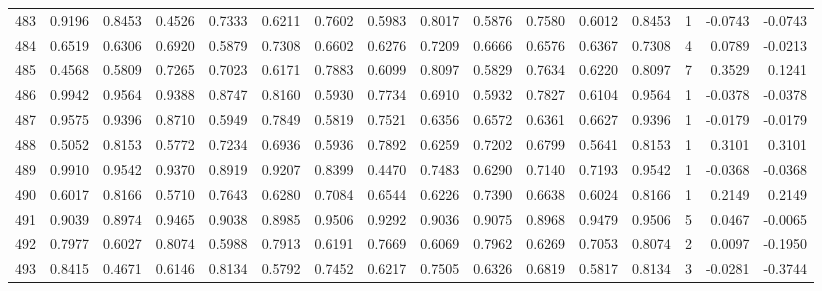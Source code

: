 \begin{tabular}{lrrrrrrrrrrrrrrr}
483 &      0.9196 &  0.8453 &  0.4526 &  0.7333 &  0.6211 &  0.7602 &  0.5983 &  0.8017 &  0.5876 &  0.7580 &   0.6012 &     0.8453 &      1 &                   -0.0743 &                    -0.0743 \\
484 &      0.6519 &  0.6306 &  0.6920 &  0.5879 &  0.7308 &  0.6602 &  0.6276 &  0.7209 &  0.6666 &  0.6576 &   0.6367 &     0.7308 &      4 &                    0.0789 &                    -0.0213 \\
485 &      0.4568 &  0.5809 &  0.7265 &  0.7023 &  0.6171 &  0.7883 &  0.6099 &  0.8097 &  0.5829 &  0.7634 &   0.6220 &     0.8097 &      7 &                    0.3529 &                     0.1241 \\
486 &      0.9942 &  0.9564 &  0.9388 &  0.8747 &  0.8160 &  0.5930 &  0.7734 &  0.6910 &  0.5932 &  0.7827 &   0.6104 &     0.9564 &      1 &                   -0.0378 &                    -0.0378 \\
487 &      0.9575 &  0.9396 &  0.8710 &  0.5949 &  0.7849 &  0.5819 &  0.7521 &  0.6356 &  0.6572 &  0.6361 &   0.6627 &     0.9396 &      1 &                   -0.0179 &                    -0.0179 \\
488 &      0.5052 &  0.8153 &  0.5772 &  0.7234 &  0.6936 &  0.5936 &  0.7892 &  0.6259 &  0.7202 &  0.6799 &   0.5641 &     0.8153 &      1 &                    0.3101 &                     0.3101 \\
489 &      0.9910 &  0.9542 &  0.9370 &  0.8919 &  0.9207 &  0.8399 &  0.4470 &  0.7483 &  0.6290 &  0.7140 &   0.7193 &     0.9542 &      1 &                   -0.0368 &                    -0.0368 \\
490 &      0.6017 &  0.8166 &  0.5710 &  0.7643 &  0.6280 &  0.7084 &  0.6544 &  0.6226 &  0.7390 &  0.6638 &   0.6024 &     0.8166 &      1 &                    0.2149 &                     0.2149 \\
491 &      0.9039 &  0.8974 &  0.9465 &  0.9038 &  0.8985 &  0.9506 &  0.9292 &  0.9036 &  0.9075 &  0.8968 &   0.9479 &     0.9506 &      5 &                    0.0467 &                    -0.0065 \\
492 &      0.7977 &  0.6027 &  0.8074 &  0.5988 &  0.7913 &  0.6191 &  0.7669 &  0.6069 &  0.7962 &  0.6269 &   0.7053 &     0.8074 &      2 &                    0.0097 &                    -0.1950 \\
493 &      0.8415 &  0.4671 &  0.6146 &  0.8134 &  0.5792 &  0.7452 &  0.6217 &  0.7505 &  0.6326 &  0.6819 &   0.5817 &     0.8134 &      3 &                   -0.0281 &                    -0.3744 \\

\end{tabular}
